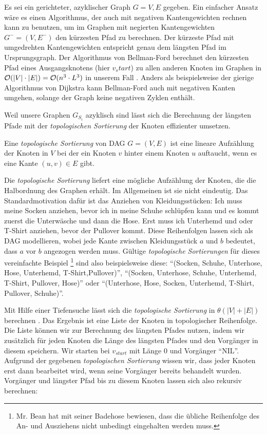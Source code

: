 Es sei ein gerichteter, azyklischer Graph $G = V,E$ gegeben. Ein einfacher Ansatz wäre es einen Algorithmus, der auch mit negativen Kantengewichten rechnen kann zu benutzen, um im Graphen mit negierten Kantengewichten $G^{-} = (V,E^{-})$ den kürzesten Pfad zu berechnen. Der kürzeste Pfad mit umgedrehten Kantengewichten entspricht genau dem längsten Pfad im Ursprungsgraph. Der Algorithmus von Bellman-Ford berechnet den kürzesten Pfad eines Ausgangsknotens (hier $v_start$) zu allen anderen Knoten im Graphen in $\mathcal{O}(|V|\cdot |E|) = \mathcal{O}(n^3\cdot L^3)$ in unserem Fall \cite{clrs09}. Anders als beispielsweise der gierige Algorithmus von Dijkstra kann Bellman-Ford auch mit negativen Kanten umgehen, solange der Graph keine negativen Zyklen enthält. 

Weil unsere Graphen $G_{S_i}$ azyklisch sind lässt sich die Berechnung der längsten Pfade mit der \emph{topologischen Sortierung} der Knoten effizienter umsetzen.

\begin{definition}
	Eine \emph{topologische Sortierung} von DAG $G = (V,E)$ ist eine lineare Aufzählung der Knoten in $V$ bei der ein Knoten $v$ hinter einem Knoten $u$ auftaucht, wenn es eine Kante $(u,v)\in E$ gibt.
\end{definition}

Die \emph{topologische Sortierung} liefert eine mögliche Aufzählung der Knoten, die die Halbordnung des Graphen erhält. Im Allgemeinen ist sie nicht eindeutig. Das Standardmotivation dafür ist das Anziehen von Kleidungsstücken: Ich muss meine Socken anziehen, bevor ich in meine Schuhe schlüpfen kann und es kommt zuerst die Unterwäsche und dann die Hose. Erst muss ich Unterhemd und oder T-Shirt anziehen, bevor der Pullover kommt. Diese Reihenfolgen lassen sich als DAG modellieren, wobei jede Kante zwischen Kleidungsstück $a$ und $b$ bedeutet, dass $a$ vor $b$ angezogen werden muss. Gültige \emph{topologische Sortierungen} für dieses vereinfachte Beispiel \footnote{Mr. Bean hat mit seiner Badehose bewiesen, dass die übliche Reihenfolge des An- und Ausziehens nicht unbedingt eingehalten werden muss.} sind also beispielsweise diese: \enquote{(Socken, Schuhe, Unterhose, Hose, Unterhemd, T-Shirt,Pullover)}, \enquote{(Socken, Unterhose, Schuhe, Unterhemd, T-Shirt, Pullover, Hose)} oder \enquote{(Unterhose, Hose, Socken, Unterhemd, T-Shirt, Pullover, Schuhe)}. 

Mit Hilfe einer Tiefensuche lässt sich die \emph{topologische Sortierung} in $\theta(|V| + |E|)$ berechnen \cite{clrs09}. Das Ergebnis ist eine Liste der Knoten in topologischer Reihenfolge. Die Liste können wir zur Berechnung des längsten Pfades nutzen, indem wir zusätzlich für jeden Knoten die Länge des längsten Pfades und den Vorgänger in diesem speichern. Wir starten bei $v_{start}$ mit Länge 0 und Vorgänger \enquote{NIL}. Aufgrund der gegebenen \emph{topologischen Sortierung} wissen wir, dass jeder Knoten erst dann bearbeitet wird, wenn seine Vorgänger bereits behandelt wurden. Vorgänger und längster Pfad bis zu diesem Knoten lassen sich also rekursiv berechnen:

